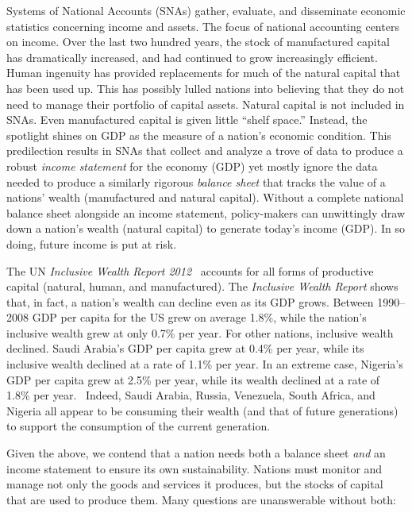 Systems of National Accounts (SNAs) gather, evaluate, and disseminate 
economic statistics concerning income and assets. 
The focus of national accounting centers on income. 
Over the last two hundred years, the stock of manufactured capital has
dramatically increased, and had continued to grow increasingly efficient. 
Human ingenuity has provided replacements for much of the
natural capital that has been used up. 
This has possibly lulled nations into believing that they 
do not need to manage their portfolio of capital assets. 
Natural capital is not included in SNAs. 
Even manufactured capital is given little ``shelf space.'' 
Instead, the spotlight shines on GDP as the measure of a nation’s economic condition. 
This predilection results in SNAs that collect and analyze a trove of data to
produce a robust \emph{income statement} for the economy (GDP)
yet mostly ignore the data needed to produce a similarly rigorous
\emph{balance sheet} that tracks the value 
of a nations' wealth (manufactured and natural capital). 
Without a complete national balance sheet alongside an income statement, 
policy-makers can unwittingly draw down a nation’s wealth (natural capital) 
to generate today’s income (GDP). 
In so doing, future income is put at risk. 

The UN \emph{Inclusive Wealth Report 2012}~\cite{IWR2012} 
accounts for all forms of productive capital (natural, human, and manufactured). 
The \emph{Inclusive Wealth Report} shows that, in fact, 
a nation’s wealth can decline even as its GDP grows. 
Between 1990--2008 GDP per capita for the US grew on average 1.8\%, 
while the nation's inclusive wealth grew at only 0.7\% per year. 
For other nations, inclusive wealth declined. 
Saudi Arabia's GDP per capita grew at 0.4\% per year, 
while its inclusive wealth declined at a rate of 1.1\% per year. 
In an extreme case, Nigeria's GDP per capita grew at 2.5\% per year, 
while its wealth declined at a rate of 1.8\% per year.~\cite[p. 44]{IWR2012}  
Indeed, Saudi Arabia, Russia, Venezuela, South Africa, and Nigeria 
all appear to be consuming their wealth (and that of future generations) 
to support the consumption of the current generation.

Given the above, we contend that a nation needs both 
a balance sheet \emph{and} 
an income statement 
to ensure its own sustainability. 
Nations must monitor and manage not only the goods and services it produces, 
but the stocks of capital that are used to produce them. 
Many questions are unanswerable without both:


